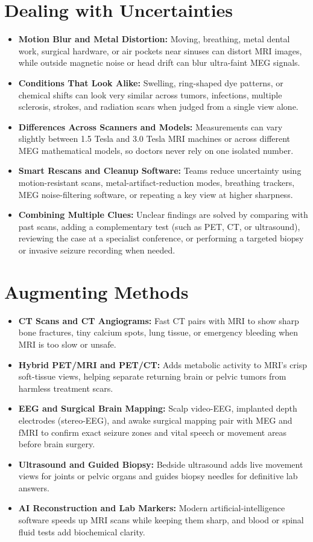 \section{Dealing with Uncertainties}
\begin{itemize}
  \item \textbf{Motion Blur and Metal Distortion:} Moving, breathing, metal dental work, surgical hardware, or air pockets near sinuses can distort MRI images, while outside magnetic noise or head drift can blur ultra-faint MEG signals.
  \item \textbf{Conditions That Look Alike:} Swelling, ring-shaped dye patterns, or chemical shifts can look very similar across tumors, infections, multiple sclerosis, strokes, and radiation scars when judged from a single view alone.
  \item \textbf{Differences Across Scanners and Models:} Measurements can vary slightly between 1.5 Tesla and 3.0 Tesla MRI machines or across different MEG mathematical models, so doctors never rely on one isolated number.
  \item \textbf{Smart Rescans and Cleanup Software:} Teams reduce uncertainty using motion-resistant scans, metal-artifact-reduction modes, breathing trackers, MEG noise-filtering software, or repeating a key view at higher sharpness.
  \item \textbf{Combining Multiple Clues:} Unclear findings are solved by comparing with past scans, adding a complementary test (such as PET, CT, or ultrasound), reviewing the case at a specialist conference, or performing a targeted biopsy or invasive seizure recording when needed.
\end{itemize}

\section{Augmenting Methods}
\begin{itemize}
  \item \textbf{CT Scans and CT Angiograms:} Fast CT pairs with MRI to show sharp bone fractures, tiny calcium spots, lung tissue, or emergency bleeding when MRI is too slow or unsafe.
  \item \textbf{Hybrid PET/MRI and PET/CT:} Adds metabolic activity to MRI's crisp soft-tissue views, helping separate returning brain or pelvic tumors from harmless treatment scars.
  \item \textbf{EEG and Surgical Brain Mapping:} Scalp video-EEG, implanted depth electrodes (stereo-EEG), and awake surgical mapping pair with MEG and fMRI to confirm exact seizure zones and vital speech or movement areas before brain surgery.
  \item \textbf{Ultrasound and Guided Biopsy:} Bedside ultrasound adds live movement views for joints or pelvic organs and guides biopsy needles for definitive lab answers.
  \item \textbf{AI Reconstruction and Lab Markers:} Modern artificial-intelligence software speeds up MRI scans while keeping them sharp, and blood or spinal fluid tests add biochemical clarity.
\end{itemize}

